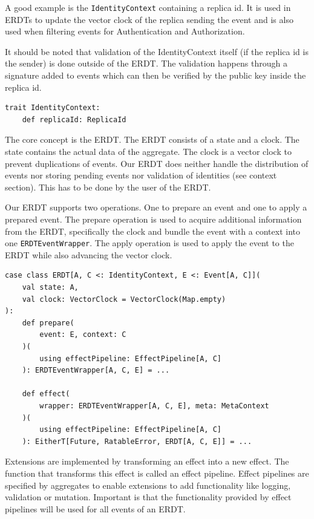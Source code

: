 \documentclass[
	english,
	ruledheaders=section,   %
	class=report,		    %
	thesis={type=bachelor}, %
	accentcolor=9c,			%
	custommargins=true,    %
	marginpar=false,        %
	parskip=half-,          %
	fontsize=11pt,          %
]{tudapub}
\begin{document}
A good example is the \texttt{IdentityContext} containing a replica id. It is used in ERDTs to update the vector clock of the replica sending the event and is also used when filtering events for Authentication and Authorization.

It should be noted that validation of the IdentityContext itself (if the replica id is the sender) is done outside of the ERDT. The validation happens through a signature added to events which can then be verified by the public key inside the replica id.

\begin{lstlisting}
trait IdentityContext:
	def replicaId: ReplicaId
\end{lstlisting}

The core concept is the ERDT. The ERDT consists of a state and a clock. The state contains the actual data of the aggregate. The clock is a vector clock to prevent duplications of events. Our ERDT does neither handle the distribution of events nor storing pending events nor validation of identities (see context section). This has to be done by the user of the ERDT.

Our ERDT supports two operations. One to prepare an event and one to apply a prepared event. The prepare operation is used to acquire additional information from the ERDT, specifically the clock and bundle the event with a context into one \texttt{ERDTEventWrapper}. The apply operation is used to apply the event to the ERDT while also advancing the vector clock.

\begin{lstlisting}
case class ERDT[A, C <: IdentityContext, E <: Event[A, C]](
	val state: A,
	val clock: VectorClock = VectorClock(Map.empty)
):
	def prepare(
		event: E, context: C
	)(
		using effectPipeline: EffectPipeline[A, C]
	): ERDTEventWrapper[A, C, E] = ...

	def effect(
		wrapper: ERDTEventWrapper[A, C, E], meta: MetaContext
	)(
		using effectPipeline: EffectPipeline[A, C]
	): EitherT[Future, RatableError, ERDT[A, C, E]] = ...
\end{lstlisting}

Extensions are implemented by transforming an effect into a new effect. The function that transforms this effect is called an effect pipeline. Effect pipelines are specified by aggregates to enable extensions to add functionality like logging, validation or mutation. Important is that the functionality provided by effect pipelines will be used for all events of an ERDT. 
\end{document}
